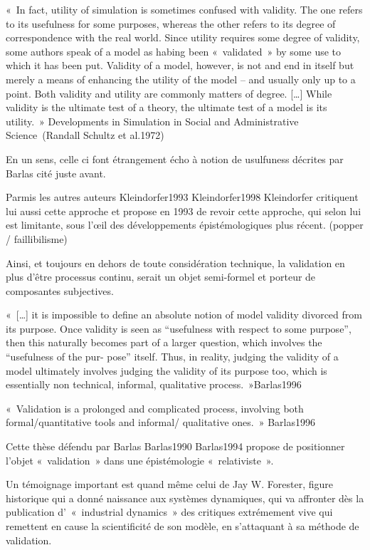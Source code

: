 « In fact, utility of simulation is sometimes confused with validity. The one refers to its usefulness for some purposes, whereas the other refers to its degree of correspondence with the real world. Since utility requires some degree of validity, some authors speak of a model as habing been « validated » by some use to which it has been put. Validity of a model, however, is not and end in itself but merely a means of enhancing the utility of the model – and usually only up to a point. Both validity and utility are commonly matters of degree. […] While validity is the ultimate test of a theory, the ultimate test of a model is its utility. » Developments in Simulation in Social and Administrative Science (Randall Schultz et al.1972)

En un sens, celle ci font étrangement écho à notion de usulfuness décrites par Barlas cité juste avant.

Parmis les autres auteurs {Kleindorfer1993} {Kleindorfer1998} Kleindorfer critiquent lui aussi cette approche et propose en 1993 de revoir cette approche, qui selon lui est limitante, sous l’œil des développements épistémologiques plus récent. (popper / faillibilisme)

Ainsi, et toujours en dehors de toute considération technique, la validation en plus d'être processus continu, serait un objet semi-formel et porteur de composantes subjectives.

« […] it is impossible to define an absolute notion of model validity divorced from its purpose. Once validity is seen as “usefulness with respect to some purpose”, then this naturally becomes part of a larger question, which involves the “usefulness of the pur- pose” itself. Thus, in reality, judging the validity of a model ultimately involves judging the validity of its purpose too, which is essentially non technical, informal, qualitative process. »{Barlas1996}

« Validation is a prolonged and complicated process, involving both formal/quantitative tools and informal/ qualitative ones. » {Barlas1996}

Cette thèse défendu par Barlas {Barlas1990} {Barlas1994} propose de positionner  l'objet « validation » dans une épistémologie « relativiste ».

Un témoignage important est quand même celui de Jay W. Forester, figure historique qui a donné naissance aux systèmes dynamiques, qui va affronter dès la publication d' « industrial dynamics » des critiques extrémement vive qui remettent en cause la scientificité de son modèle, en s'attaquant à sa méthode de validation.
